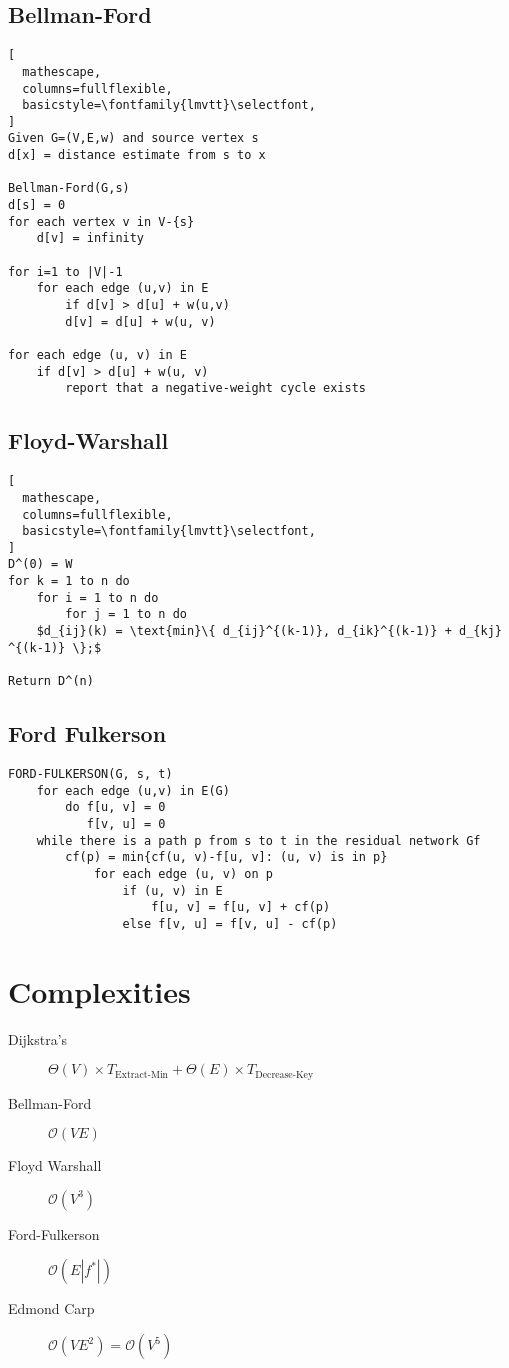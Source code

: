 \documentclass{article}
\begin{document}
\subsection{Bellman-Ford}
\begin{lstlisting}[
  mathescape,
  columns=fullflexible,
  basicstyle=\fontfamily{lmvtt}\selectfont,
]
Given G=(V,E,w) and source vertex s
d[x] = distance estimate from s to x

Bellman-Ford(G,s)
d[s] = 0
for each vertex v in V-{s}
    d[v] = infinity

for i=1 to |V|-1
    for each edge (u,v) in E
        if d[v] > d[u] + w(u,v)
        d[v] = d[u] + w(u, v)

for each edge (u, v) in E
    if d[v] > d[u] + w(u, v)
        report that a negative-weight cycle exists
\end{lstlisting}

\subsection{Floyd-Warshall}
\begin{lstlisting}[
  mathescape,
  columns=fullflexible,
  basicstyle=\fontfamily{lmvtt}\selectfont,
]
D^(0) = W
for k = 1 to n do
    for i = 1 to n do
        for j = 1 to n do
    $d_{ij}(k) = \text{min}\{ d_{ij}^{(k-1)}, d_{ik}^{(k-1)} + d_{kj} ^{(k-1)} \};$

Return D^(n)
\end{lstlisting}

\subsection{Ford Fulkerson}
\begin{lstlisting}
FORD-FULKERSON(G, s, t)
    for each edge (u,v) in E(G)
        do f[u, v] = 0
           f[v, u] = 0
    while there is a path p from s to t in the residual network Gf
        cf(p) = min{cf(u, v)-f[u, v]: (u, v) is in p}
            for each edge (u, v) on p
                if (u, v) in E
                    f[u, v] = f[u, v] + cf(p)
                else f[v, u] = f[v, u] - cf(p)
\end{lstlisting}

\section{Complexities}
\begin{description}
    \item [Dijkstra's] $\Theta (V) \times T_{\text{Extract-Min}} + \Theta(E) \times T_{\text{Decrease-Key}} $
    \item [Bellman-Ford] $\mathcal{O}(VE)$
    \item [Floyd Warshall] $\mathcal{O}(V^3)$
    \item [Ford-Fulkerson] $\mathcal{O}(E|f^*|)$
    \item [Edmond Carp] $\mathcal{O}(VE^2) = \mathcal{O}(V^5)$
\end{description}
\end{document}
